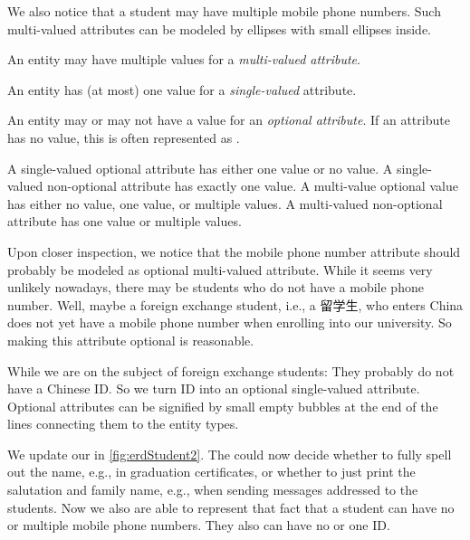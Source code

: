 We also notice that a student may have multiple mobile phone numbers.
Such multi-valued attributes can be modeled by ellipses with small ellipses inside.%
%
\begin{definition}%
An entity may have multiple values for a \emph{multi-valued attribute}.%
\end{definition}%
\begin{definition}%
An entity has (at most) one value for a \emph{single-valued} attribute.%
\end{definition}%
\begin{definition}%
An entity may or may not have a value for an \emph{optional attribute}. %
If an attribute has no value, this is often represented as .%
\end{definition}%
%
A single-valued optional attribute has either one value or no value.
A single-valued non-optional attribute has exactly one value.
A multi-value optional value has either no value, one value, or multiple values.
A multi-valued non-optional attribute has one value or multiple values.

Upon closer inspection, we notice that the mobile phone number attribute should probably be modeled as optional multi-valued attribute.
While it seems very unlikely nowadays, there may be students who do not have a mobile phone number.
Well, maybe a foreign exchange student, i.e., a 留学生, who enters China does not yet have a mobile phone number when enrolling into our university.
So making this attribute optional is reasonable.

While we are on the subject of foreign exchange students:
They probably do not have a Chinese ID.
So we turn ID into an optional single-valued attribute.
Optional attributes can be signified by small empty bubbles at the end of the lines connecting them to the entity types.

We update our  in \cref{fig:erdStudent2}.
The  could now decide whether to fully spell out the name, e.g., in graduation certificates, or whether to just print the salutation and family name, e.g., when sending messages addressed to the students.
Now we also are able to represent that fact that a student can have no or multiple mobile phone numbers.
They also can have no or one ID.

